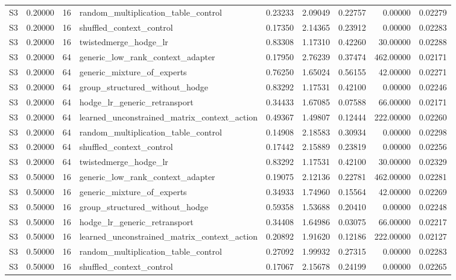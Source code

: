 \begin{tabular}{lrrlrrrrr}
S3 & 0.20000 & 16 & random_multiplication_table_control & 0.23233 & 2.09049 & 0.22757 & 0.00000 & 0.02279 \\
S3 & 0.20000 & 16 & shuffled_context_control & 0.17350 & 2.14365 & 0.23912 & 0.00000 & 0.02283 \\
S3 & 0.20000 & 16 & twistedmerge_hodge_lr & 0.83308 & 1.17310 & 0.42260 & 30.00000 & 0.02288 \\
S3 & 0.20000 & 64 & generic_low_rank_context_adapter & 0.17950 & 2.76239 & 0.37474 & 462.00000 & 0.02171 \\
S3 & 0.20000 & 64 & generic_mixture_of_experts & 0.76250 & 1.65024 & 0.56155 & 42.00000 & 0.02271 \\
S3 & 0.20000 & 64 & group_structured_without_hodge & 0.83292 & 1.17531 & 0.42100 & 0.00000 & 0.02246 \\
S3 & 0.20000 & 64 & hodge_lr_generic_retransport & 0.34433 & 1.67085 & 0.07588 & 66.00000 & 0.02171 \\
S3 & 0.20000 & 64 & learned_unconstrained_matrix_context_action & 0.49367 & 1.49807 & 0.12444 & 222.00000 & 0.02260 \\
S3 & 0.20000 & 64 & random_multiplication_table_control & 0.14908 & 2.18583 & 0.30934 & 0.00000 & 0.02298 \\
S3 & 0.20000 & 64 & shuffled_context_control & 0.17442 & 2.15889 & 0.23819 & 0.00000 & 0.02256 \\
S3 & 0.20000 & 64 & twistedmerge_hodge_lr & 0.83292 & 1.17531 & 0.42100 & 30.00000 & 0.02329 \\
S3 & 0.50000 & 16 & generic_low_rank_context_adapter & 0.19075 & 2.12136 & 0.22781 & 462.00000 & 0.02281 \\
S3 & 0.50000 & 16 & generic_mixture_of_experts & 0.34933 & 1.74960 & 0.15564 & 42.00000 & 0.02269 \\
S3 & 0.50000 & 16 & group_structured_without_hodge & 0.59358 & 1.53688 & 0.20410 & 0.00000 & 0.02248 \\
S3 & 0.50000 & 16 & hodge_lr_generic_retransport & 0.34408 & 1.64986 & 0.03075 & 66.00000 & 0.02217 \\
S3 & 0.50000 & 16 & learned_unconstrained_matrix_context_action & 0.20892 & 1.91620 & 0.12186 & 222.00000 & 0.02127 \\
S3 & 0.50000 & 16 & random_multiplication_table_control & 0.27092 & 1.99932 & 0.27315 & 0.00000 & 0.02283 \\
S3 & 0.50000 & 16 & shuffled_context_control & 0.17067 & 2.15678 & 0.24199 & 0.00000 & 0.02265 \\

\end{tabular}
